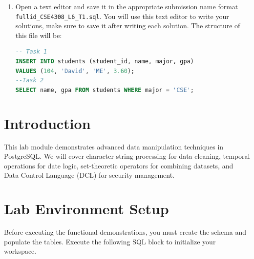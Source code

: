 \documentclass[12pt,a4paper]{article}
\begin{document}
\begin{enumerate}
After loading the SQL file, reconnect to PostgreSQL to verify that the tables have been created.

1. Reconnect to Your Database:

   \begin{lstlisting}[language=SQL]
   psql -h localhost -U student_12345 -d cse4308_12345
   \end{lstlisting}

2. Check Tables:

   Verify the tables have been created by listing them:

   \begin{lstlisting}[language=SQL]
   \dt
   \end{lstlisting}

3. View Table Data:

   Verify the data by running the following SQL queries:

   \begin{lstlisting}[language=SQL]
   SELECT * FROM <table_name>;
   \end{lstlisting}

\item Open a text editor and save it in the appropriate submission name format \\ \texttt{fullid\_CSE4308\_L6\_T1.sql}. You will use this text editor to write your solutions, make sure to save it after writing each solution. The structure of this file will be:
\begin{lstlisting}[language=SQL]
-- Task 1
INSERT INTO students (student_id, name, major, gpa)
VALUES (104, 'David', 'ME', 3.60);
--Task 2
SELECT name, gpa FROM students WHERE major = 'CSE';
\end{lstlisting}
\end{enumerate}
\newpage

\section{Introduction}
This lab module demonstrates advanced data manipulation techniques in PostgreSQL. We will cover character string processing for data cleaning, temporal operations for date logic, set-theoretic operators for combining datasets, and Data Control Language (DCL) for security management.

\section{Lab Environment Setup}
Before executing the functional demonstrations, you must create the schema and populate the tables. Execute the following SQL block to initialize your workspace.
\end{document}
